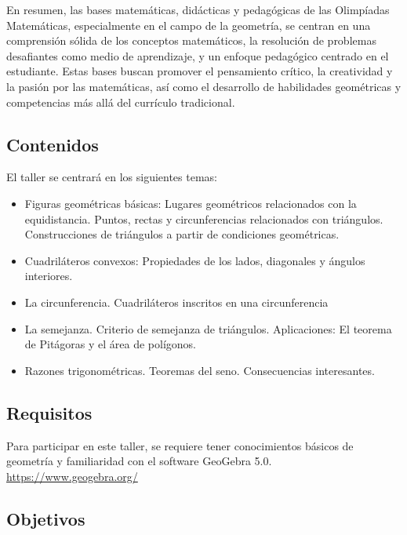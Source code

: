 En resumen, las bases matemáticas, didácticas y pedagógicas de las Olimpíadas Matemáticas, especialmente en el campo de la geometría, se centran en una comprensión sólida de los conceptos matemáticos, la resolución de problemas desafiantes como medio de aprendizaje, y un enfoque pedagógico centrado en el estudiante. Estas bases buscan promover el pensamiento crítico, la creatividad y la pasión por las matemáticas, así como el desarrollo de habilidades geométricas y competencias más allá del currículo tradicional.

\subsection{Contenidos}

El taller se centrará en los siguientes temas: 
\begin{itemize}
	\item Figuras geométricas básicas: Lugares geométricos relacionados con la equidistancia. Puntos, rectas y circunferencias relacionados con triángulos. Construcciones de triángulos a partir de condiciones geométricas.
	\item Cuadriláteros convexos: Propiedades de los lados, diagonales y ángulos interiores.
	\item La circunferencia. Cuadriláteros inscritos en una circunferencia 
	\item La semejanza. Criterio de semejanza de triángulos. Aplicaciones: El teorema de Pitágoras y el área de polígonos. 
	\item Razones trigonométricas. Teoremas del seno. Consecuencias interesantes.
\end{itemize}

\subsection{Requisitos}

Para participar en este taller, se requiere tener conocimientos básicos de geometría y familiaridad con el software GeoGebra 5.0. \url{https://www.geogebra.org/}

\subsection{Objetivos}

